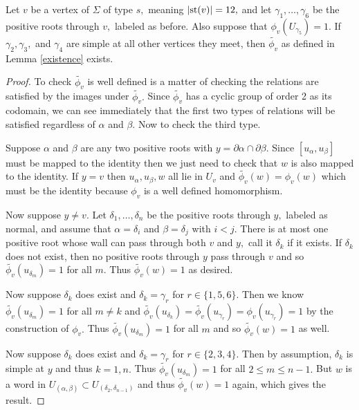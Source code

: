 \documentclass[class=book, crop=false]{standalone}
\begin{document}
	\begin{lemma} Let $v$ be a vertex of $\Sigma$ of type $s,$ meaning $|\mathrm{st}(v)|=12,$ and let $\gamma_1,\dots,\gamma_6$ be the positive roots through $v,$ labeled as before. Also suppose that $\phi_v(U_{\gamma_5})=1.$ If $\gamma_2,\gamma_3,$ and $\gamma_4$ are simple at all other vertices they meet, then $\tilde{\phi_v}$ as defined in Lemma \ref{existence} exists.
	\label{336f2existence}
\end{lemma}
\begin{proof}
	To check $\tilde{\phi_v}$ is well defined is a matter of checking the relations are satisfied by the images under $\tilde{\phi_v}.$ Since $\tilde{\phi_v}$ has a cyclic group of order 2 as its codomain, we can see immediately that the first two types of relations will be satisfied regardless of $\alpha$ and $\beta.$ Now to check the third type.

	Suppose $\alpha$ and $\beta$ are any two positive roots with $y=\partial\alpha\cap \partial\beta.$ Since $[u_\alpha,u_\beta]$ must be mapped to the identity then we just need to check that $w$ is also mapped to the identity. If $y=v$ then $u_\alpha,u_\beta,w$ all lie in $U_v$ and $\tilde{\phi_v}(w)=\phi_v(w)$ which must be the identity because $\phi_v$ is a well defined homomorphism.

	Now suppose $y\neq v.$ Let $\delta_1,\dots,\delta_n$ be the positive roots through $y,$ labeled as normal, and assume that $\alpha=\delta_i$ and $\beta=\delta_j$ with $i<j.$ There is at most one positive root whose wall can pass through both $v$ and $y,$ call it $\delta_k$ if it exists. If $\delta_k$ does not exist, then no positive roots through $y$ pass through $v$ and so $\tilde{\phi_v}(u_{\delta_m})=1$ for all $m.$ Thus $\tilde{\phi_v}(w)=1$ as desired.

	Now suppose $\delta_k$ does exist and $\delta_k=\gamma_r$ for $r\in \{1,5,6\}.$ Then we know $\tilde{\phi_v}(u_{\delta_m})=1$ for all  $m\neq k$ and $\tilde{\phi_v}(u_{\delta_k})=\tilde{\phi_v}(u_{\gamma_r})=\phi_v(u_{\gamma_r})=1$ by the construction of $\phi_v.$ Thus $\tilde{\phi_v}(u_{\delta_m})=1$ for all $m$ and so $\tilde{\phi_v}(w)=1$ as well.

	Now suppose $\delta_k$ does exist and $\delta_k=\gamma_r$ for $r\in \{2,3,4\}.$ Then by assumption, $\delta_k$ is simple at $y$ and thus $k=1,n.$ Thus $\tilde{\phi_v}(u_{\delta_m})=1$ for all $2\le m\le n-1.$ But $w$ is a word in $U_{(\alpha,\beta)}\subset U_{(\delta_2,\delta_{n-1})}$ and thus $\tilde{\phi_v}(w)=1$ again, which gives the result.
\end{proof}
\end{document}
